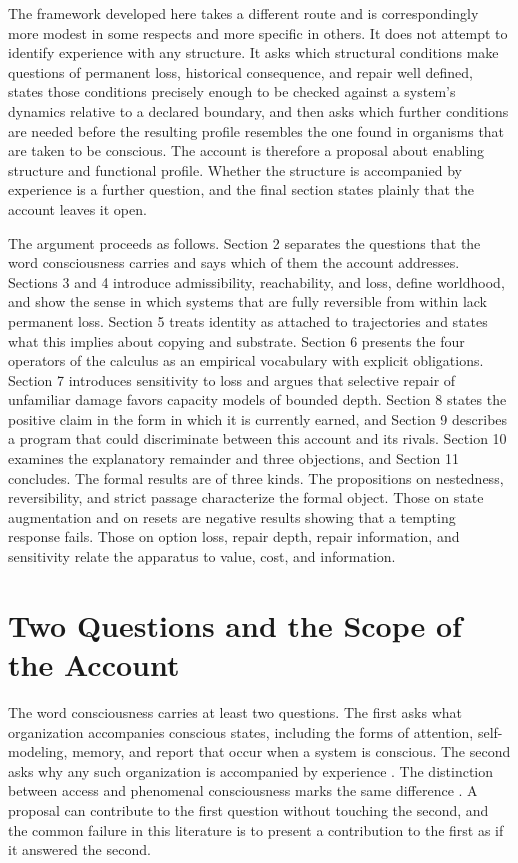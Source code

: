 \documentclass[11pt]{article}
\theoremstyle{definition}
\theoremstyle{plain}
\theoremstyle{remark}
\begin{document}
The framework developed here takes a different route and is correspondingly more modest in some respects and more specific in others. It does not attempt to identify experience with any structure. It asks which structural conditions make questions of permanent loss, historical consequence, and repair well defined, states those conditions precisely enough to be checked against a system's dynamics relative to a declared boundary, and then asks which further conditions are needed before the resulting profile resembles the one found in organisms that are taken to be conscious. The account is therefore a proposal about enabling structure and functional profile. Whether the structure is accompanied by experience is a further question, and the final section states plainly that the account leaves it open.

The argument proceeds as follows. Section 2 separates the questions that the word consciousness carries and says which of them the account addresses. Sections 3 and 4 introduce admissibility, reachability, and loss, define worldhood, and show the sense in which systems that are fully reversible from within lack permanent loss. Section 5 treats identity as attached to trajectories and states what this implies about copying and substrate. Section 6 presents the four operators of the calculus as an empirical vocabulary with explicit obligations. Section 7 introduces sensitivity to loss and argues that selective repair of unfamiliar damage favors capacity models of bounded depth. Section 8 states the positive claim in the form in which it is currently earned, and Section 9 describes a program that could discriminate between this account and its rivals. Section 10 examines the explanatory remainder and three objections, and Section 11 concludes. The formal results are of three kinds. The propositions on nestedness, reversibility, and strict passage characterize the formal object. Those on state augmentation and on resets are negative results showing that a tempting response fails. Those on option loss, repair depth, repair information, and sensitivity relate the apparatus to value, cost, and information.

\section{Two Questions and the Scope of the Account}

The word consciousness carries at least two questions. The first asks what organization accompanies conscious states, including the forms of attention, self-modeling, memory, and report that occur when a system is conscious. The second asks why any such organization is accompanied by experience \cite{chalmers1995,nagel1974}. The distinction between access and phenomenal consciousness marks the same difference \cite{block1995}. A proposal can contribute to the first question without touching the second, and the common failure in this literature is to present a contribution to the first as if it answered the second.
\end{document}
